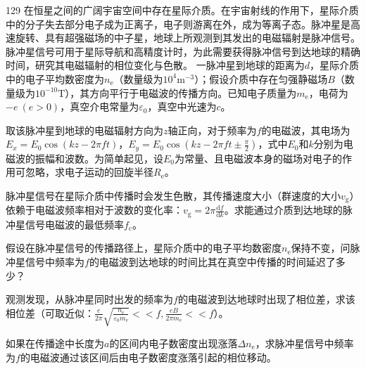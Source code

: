 \begin{problem}[第37届全国中学生物理竞赛决赛][脉冲星信号与星际介质]{129}
    在恒星之间的广阔宇宙空间中存在星际介质。在宇宙射线的作用下，星际介质中的分子失去部分电子成为正离子，电子则游离在外，成为等离子态。脉冲星是高速旋转、具有超强磁场的中子星，地球上所观测到其发出的电磁辐射是脉冲信号。脉冲星信号可用于星际导航和高精度计时，为此需要获得脉冲信号到达地球的精确时间，研究其电磁辐射的相位变化与色散。
    一脉冲星到地球的距离为$d$，星际介质中的电子平均数密度为$n _ { \mathrm { e } }$（数量级为$10^{4} \mathrm{m}^{-3}$）；假设介质中存在匀强静磁场$B$（数量级为$10^{-10} \mathrm{T}$），其方向平行于电磁波的传播方向。已知电子质量为$m _ { \mathrm { e } }$，电荷为$- e \ ( e > 0 )$，真空介电常量为$\varepsilon _ { 0 }$，真空中光速为$c$。
    \begin{subproblem}
        取该脉冲星到地球的电磁辐射方向为$z$轴正向，对于频率为$f$的电磁波，其电场为$E _ { x } = E _ { 0 } \cos ( k z - 2 \pi f t )$，$E _ { y } = E _ { 0 } \cos ( k z - 2 \pi f t \pm \frac { \pi } { 2 } )$，式中$E _ { 0 }$和$k$分别为电磁波的振幅和波数。为简单起见，设$E _ { 0 }$为常量、且电磁波本身的磁场对电子的作用可忽略，求电子运动的回旋半径$R _ { \mathrm { e } }$。
    \end{subproblem}
    \begin{subproblem}
        脉冲星信号在星际介质中传播时会发生色散，其传播速度大小（群速度的大小$v _ { \mathrm { g } }$）依赖于电磁波频率相对于波数的变化率：$v _ { \mathrm { g } } = 2 \pi \frac { \mathrm { d } f } { \mathrm { d } k }$。求能通过介质到达地球的脉冲星信号电磁波的最低频率$f _ { \mathrm { c } }$。
    \end{subproblem}
    \begin{subproblem}
        假设在脉冲星信号的传播路径上，星际介质中的电子平均数密度$n _ { \mathrm { e } }$保持不变，问脉冲星信号中频率为$f$的电磁波到达地球的时间比其在真空中传播的时间延迟了多少？
    \end{subproblem}
    \begin{subproblem}
        观测发现，从脉冲星同时出发的频率为$f$的电磁波到达地球时出现了相位差，求该相位差（可取近似：$\frac { e } { 2 \pi } \sqrt { \frac { n _ { \mathrm { e } } } { \varepsilon _ { 0 } m _ { \mathrm { e } } } } << f , \frac { e B } { 2 \pi m _ { \mathrm { e } } } << f$）。
    \end{subproblem}
    \begin{subproblem}
        如果在传播途中长度为$a$的区间内电子数密度出现涨落$\Delta n _ { \mathrm { e } }$，求脉冲星信号中频率为$f$的电磁波通过该区间后由电子数密度涨落引起的相位移动。
    \end{subproblem}
\end{problem}